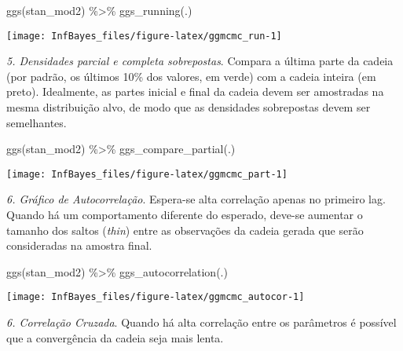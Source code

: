 \documentclass[
]{book}
\newenvironment{Shaded}{\begin{snugshade}}{\end{snugshade}}
\newcommand{\FunctionTok}[1]{\textcolor[rgb]{0.00,0.00,0.00}{#1}}
\newcommand{\NormalTok}[1]{#1}
\newcommand{\SpecialCharTok}[1]{\textcolor[rgb]{0.00,0.00,0.00}{#1}}
\begin{document}
\begin{Shaded}
\begin{Highlighting}[]
\FunctionTok{ggs}\NormalTok{(stan\_mod2) }\SpecialCharTok{\%\textgreater{}\%} \FunctionTok{ggs\_running}\NormalTok{(.)}
\end{Highlighting}
\end{Shaded}

\begin{center}\texttt{[image: InfBayes\_files/figure-latex/ggmcmc\_run-1]} \end{center}

\emph{5. Densidades parcial e completa sobrepostas}. Compara a última parte da cadeia (por padrão, os últimos 10\% dos valores, em verde) com a cadeia inteira (em preto). Idealmente, as partes inicial e final da cadeia devem ser amostradas na mesma distribuição alvo, de modo que as densidades sobrepostas devem ser semelhantes.

\begin{Shaded}
\begin{Highlighting}[]
\FunctionTok{ggs}\NormalTok{(stan\_mod2) }\SpecialCharTok{\%\textgreater{}\%} \FunctionTok{ggs\_compare\_partial}\NormalTok{(.)}
\end{Highlighting}
\end{Shaded}

\begin{center}\texttt{[image: InfBayes\_files/figure-latex/ggmcmc\_part-1]} \end{center}

\emph{6. Gráfico de Autocorrelação}. Espera-se alta correlação apenas no primeiro lag. Quando há um comportamento diferente do esperado, deve-se aumentar o tamanho dos saltos (\emph{thin}) entre as observações da cadeia gerada que serão consideradas na amostra final.

\begin{Shaded}
\begin{Highlighting}[]
\FunctionTok{ggs}\NormalTok{(stan\_mod2) }\SpecialCharTok{\%\textgreater{}\%} \FunctionTok{ggs\_autocorrelation}\NormalTok{(.)}
\end{Highlighting}
\end{Shaded}

\begin{center}\texttt{[image: InfBayes\_files/figure-latex/ggmcmc\_autocor-1]} \end{center}

\emph{6. Correlação Cruzada}. Quando há alta correlação entre os parâmetros é possível que a convergência da cadeia seja mais lenta.
\end{document}
